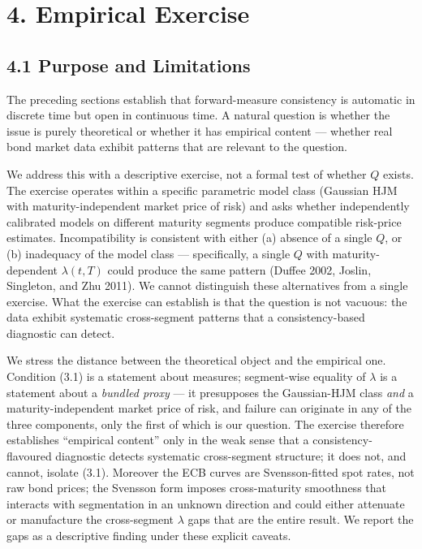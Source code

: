 \documentclass[
]{article}
\begin{document}
\section{4. Empirical Exercise}\label{empirical-exercise}

\subsection{4.1 Purpose and Limitations}\label{purpose-and-limitations}

The preceding sections establish that forward-measure consistency is
automatic in discrete time but open in continuous time. A natural
question is whether the issue is purely theoretical or whether it has
empirical content --- whether real bond market data exhibit patterns
that are relevant to the question.

We address this with a descriptive exercise, not a formal test of
whether \(Q\) exists. The exercise operates within a specific parametric
model class (Gaussian HJM with maturity-independent market price of
risk) and asks whether independently calibrated models on different
maturity segments produce compatible risk-price estimates.
Incompatibility is consistent with either (a) absence of a single \(Q\),
or (b) inadequacy of the model class --- specifically, a single \(Q\)
with maturity-dependent \(\lambda(t,T)\) could produce the same pattern
(Duffee 2002, Joslin, Singleton, and Zhu 2011). We cannot distinguish
these alternatives from a single exercise. What the exercise can
establish is that the question is not vacuous: the data exhibit
systematic cross-segment patterns that a consistency-based diagnostic
can detect.

We stress the distance between the theoretical object and the empirical
one. Condition (3.1) is a statement about measures; segment-wise
equality of \(\lambda\) is a statement about a \emph{bundled proxy} ---
it presupposes the Gaussian-HJM class \emph{and} a maturity-independent
market price of risk, and failure can originate in any of the three
components, only the first of which is our question. The exercise
therefore establishes ``empirical content'' only in the weak sense that
a consistency-flavoured diagnostic detects systematic cross-segment
structure; it does not, and cannot, isolate (3.1). Moreover the ECB
curves are Svensson-fitted spot rates, not raw bond prices; the Svensson
form imposes cross-maturity smoothness that interacts with segmentation
in an unknown direction and could either attenuate or manufacture the
cross-segment \(\lambda\) gaps that are the entire result. We report the
gaps as a descriptive finding under these explicit caveats.
\end{document}
